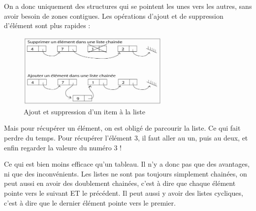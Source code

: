 On a donc uniquement des structures qui se pointent les unes vers les autres, sans avoir besoin de zones contigues. Les opérations d'ajout et de suppression d'élément sont plus rapides : 
\begin{figure}[H]
	\begin{center}
	  \includegraphics[width=20em]{Annexes/Images/liste_ajout.jpg}
	\end{center}
	\caption{Ajout et suppression d'un item à la liste}
\end{figure}

Mais pour récupérer un élément, on est obligé de parcourir la liste. Ce qui fait perdre du temps. Pour récupérer l'élément 3, il faut aller au un, puis au deux, et enfin regarder la valeure du numéro 3 !

Ce qui est bien moins efficace qu'un tableau. Il n'y a donc pas que des avantages, ni que des inconvénients. Les listes ne sont pas toujours simplement chainées, on peut aussi en avoir des doublement chainées, c'est à dire que chaque élément pointe vers le suivant ET le précédent. Il peut aussi y avoir des listes cycliques, c'est à dire que le dernier élément pointe vers le premier.
